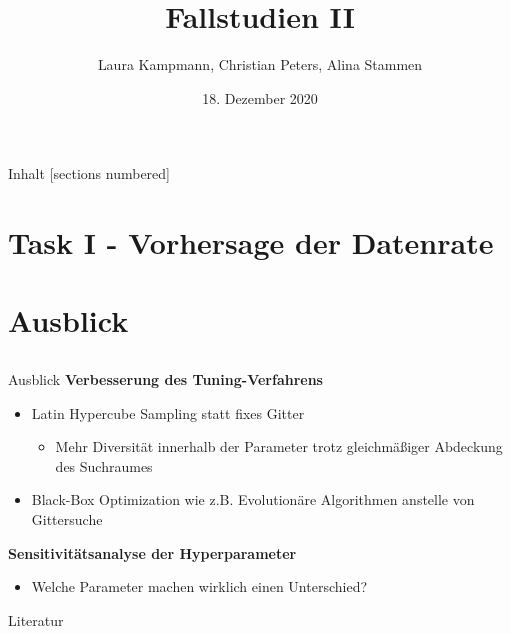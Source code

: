 \documentclass[10pt]{beamer}
\title{Fallstudien II}
\date{18. Dezember 2020}
\author{Laura Kampmann, Christian Peters, Alina Stammen}
\begin{document}
\maketitle

\begin{frame}{Inhalt}
  [sections numbered]
  \tableofcontents
\end{frame}

%

%

\section{Task I - Vorhersage der Datenrate}











\section{Ausblick}

\subsection*{}

\begin{frame}{Ausblick}
    \textbf{Verbesserung des Tuning-Verfahrens}
    \begin{itemize}
        \item Latin Hypercube Sampling statt fixes Gitter
        \begin{itemize}
            \item Mehr Diversit\"at innerhalb der Parameter trotz gleichm\"a{\ss}iger Abdeckung des Suchraumes
        \end{itemize}
        \item Black-Box Optimization wie z.B. Evolution\"are Algorithmen anstelle von Gittersuche
    \end{itemize}
    \textbf{Sensitivit\"atsanalyse der Hyperparameter}
    \begin{itemize}
        \item Welche Parameter machen wirklich einen Unterschied?
    \end{itemize}
\end{frame}



\appendix

\begin{frame}[allowframebreaks]{Literatur}

  \nocite{XGBoost}

  
  

\end{frame}


%
\end{document}
